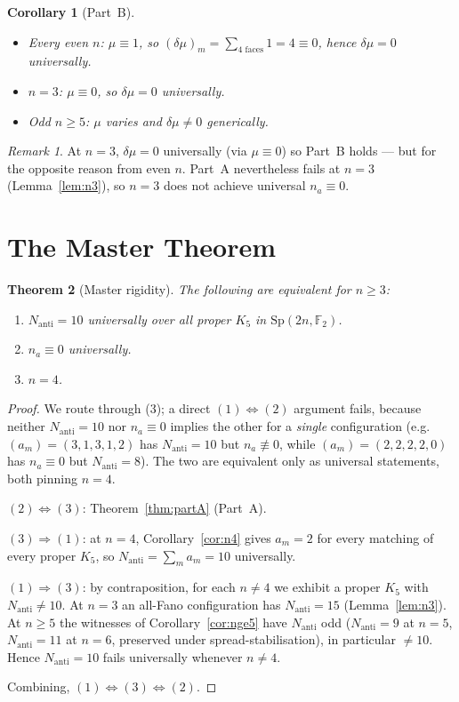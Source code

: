 \documentclass[11pt,a4paper]{article}
\newcommand{\Nanti}{N_{\mathrm{anti}}}
\newcommand{\Sp}{\mathrm{Sp}}
\newcommand{\F}{\mathbb{F}}
\theoremstyle{plain}
\newtheorem{theorem}{Theorem}[section]
\newtheorem{corollary}[theorem]{Corollary}
\theoremstyle{definition}
\theoremstyle{remark}
\newtheorem*{remark}{Remark}
\begin{document}
\begin{corollary}[Part~B]\label{cor:partB}
\begin{itemize}
  \item Every even $n$: $\mu \equiv 1$, so
        $(\delta\mu)_m = \sum_{\text{4 faces}} 1 = 4 \equiv 0$,
        hence $\delta\mu = 0$ universally.
  \item $n = 3$: $\mu \equiv 0$, so $\delta\mu = 0$ universally.
  \item Odd $n \geq 5$: $\mu$ varies and $\delta\mu \neq 0$ generically.
\end{itemize}
\end{corollary}

\begin{remark}\label{rem:n3partB}
At $n = 3$, $\delta\mu = 0$ universally (via $\mu \equiv 0$) so
Part~B holds — but for the opposite reason from even $n$.
Part~A nevertheless fails at $n = 3$ (Lemma~\ref{lem:n3}),
so $n = 3$ does not achieve universal $n_a \equiv 0$.
\end{remark}

\section{The Master Theorem}
\label{sec:master}

\begin{theorem}[Master rigidity]\label{thm:master}
The following are equivalent for $n \geq 3$:
\begin{enumerate}
  \item[(1)] $\Nanti = 10$ universally over all proper $K_5$
             in $\Sp(2n,\F_2)$.
  \item[(2)] $n_a \equiv 0$ universally.
  \item[(3)] $n = 4$.
\end{enumerate}
\end{theorem}

\begin{proof}
We route through (3); a direct $(1)\Leftrightarrow(2)$ argument fails, because
neither $\Nanti=10$ nor $n_a\equiv0$ implies the other for a \emph{single}
configuration (e.g.\ $(a_m)=(3,1,3,1,2)$ has $\Nanti=10$ but $n_a\not\equiv0$,
while $(a_m)=(2,2,2,2,0)$ has $n_a\equiv0$ but $\Nanti=8$). The two are equivalent
only as universal statements, both pinning $n=4$.

$(2)\Leftrightarrow(3)$: Theorem~\ref{thm:partA} (Part~A).

$(3)\Rightarrow(1)$: at $n=4$, Corollary~\ref{cor:n4} gives $a_m=2$ for every
matching of every proper $K_5$, so $\Nanti=\sum_m a_m=10$ universally.

$(1)\Rightarrow(3)$: by contraposition, for each $n\neq4$ we exhibit a proper $K_5$
with $\Nanti\neq10$. At $n=3$ an all-Fano configuration has $\Nanti=15$
(Lemma~\ref{lem:n3}). At $n\geq5$ the witnesses of Corollary~\ref{cor:nge5} have
$\Nanti$ odd ($\Nanti=9$ at $n=5$, $\Nanti=11$ at $n=6$, preserved under
spread-stabilisation), in particular $\neq10$. Hence $\Nanti=10$ fails universally
whenever $n\neq4$.

Combining, $(1)\Leftrightarrow(3)\Leftrightarrow(2)$.
\end{proof}
\end{document}
